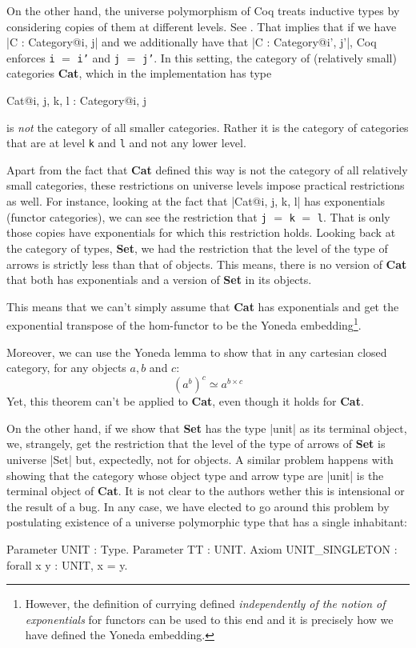 \documentclass[9pt, twocolumn]{extarticle}
\begin{document}
On the other hand, the universe polymorphism of Coq treats inductive types by considering copies of them at different levels. See \cite{DBLP:conf/itp/SozeauT14}.
That implies that if we have \Coqe|C : Category@{i, j}| and we additionally have that \Coqe|C : Category@{i', j'}|, Coq enforces \texttt{i} $=$ \texttt{i'} and \texttt{j} $=$ \texttt{j'}.
In this setting, the category of (relatively small) categories \textbf{Cat}, which in the implementation has type
\begin{Coq}
Cat@{i, j, k, l} : Category@{i, j}
\end{Coq}
is \emph{not} the category of all smaller categories.
Rather it is the category of categories that are at level \texttt{k} and \texttt{l} and not any lower level.

Apart from the fact that \textbf{Cat} defined this way is not the category of all relatively small categories, these restrictions on universe levels impose practical restrictions as well.
For instance, looking at the fact that \Coqe|Cat@{i, j, k, l}| has exponentials (functor categories), we can see the restriction that \texttt{j} $=$ \texttt{k} $=$ \texttt{l}.
That is only those copies have exponentials for which this restriction holds.
Looking back at the category of types, \textbf{Set}, we had the restriction that the level of the type of arrows is strictly less than that of objects.
This means, there is no version of \textbf{Cat} that both has exponentials and a version of \textbf{Set} in its objects.

This means that we can't simply assume that \textbf{Cat} has exponentials and get the exponential transpose of the hom-functor to be the Yoneda embedding\footnote{However, the definition of currying defined \emph{independently of the notion of exponentials} for functors can be used to this end and it is precisely how we have defined the Yoneda embedding.}.

Moreover, we can use the Yoneda lemma to show that in any cartesian closed category, for any objects $a, b$ and $c$:
\[
{(a^b)}^c \simeq a^{b \times c}
\]
Yet, this theorem can't be applied to \textbf{Cat}, even though it holds for \textbf{Cat}.

On the other hand, if we show that \textbf{Set} has the type \Coqe|unit| as its terminal object, we, strangely, get the restriction that the level of the type of arrows of \textbf{Set} is universe \Coqe|Set| but, expectedly, not for objects.
A similar problem happens with showing that the category whose object type and arrow type are \Coqe|unit| is the terminal object of \textbf{Cat}.
It is not clear to the authors wether this is intensional or the result of a bug.
In any case, we have elected to go around this problem by postulating existence of a universe polymorphic type that has a single inhabitant:
\begin{Coq}
Parameter UNIT : Type.
Parameter TT : UNIT.
Axiom UNIT_SINGLETON : forall x y : UNIT, x = y.
\end{Coq}

{}
\nocite{*}

\end{document}
